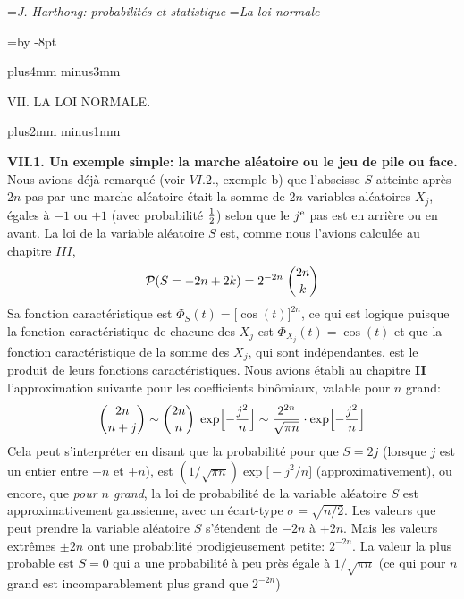 


\auteurcourant={\sl J. Harthong: probabilit\'es et statistique}
\titrecourant={\sl La loi normale}


\def\struta{\vrule depth2pt width0pt}
\def\strutb{\vrule depth4pt width0pt}
\def\strutc{\vrule depth3pt width0pt}
\newdimen\blocksize  \blocksize=\vsize \advance\blocksize by -8pt
\def\ata{\hskip-2.5pt}
\def\aub{\hskip1pt}

\null\vskip10mm plus4mm minus3mm

\centerline{\tit VII.  LA LOI NORMALE.}

\vskip10mm plus2mm minus1mm

{\bf VII.\aub 1. Un exemple simple: la marche al\'eatoire ou le jeu de
pile ou face.}  
\medskip
Nous avions d\'ej\`a remarqu\'e (voir $VI.2.$, exemple b) que l'abscisse 
$S$ atteinte apr\`es $2n$ pas par une marche al\'eatoire \'etait la somme
de $2n$ variables al\'eatoires $X_j$, \'egales \`a $-1$ ou $+1$ (avec
probabilit\'e $1 \over 2$) selon que le $j^{\rm e}$ pas est en arri\`ere ou
en avant. La loi de  la variable al\'eatoire $S$ est, comme nous l'avions
calcul\'ee au chapitre $III$,  
$${\cal P} (S = -2n + 2k) = 2^{-2n}\; {2n \choose k}$$
Sa fonction caract\'eristique est $\Phi_S(t)  = \bigl[\cos (t)\bigr]^{2n}$, 
ce qui est logique puisque la fonction caract\'eristique de chacune des
$X_j$ est $\Phi_{X_j}(t)  = \cos (t)$ et que la fonction caract\'eristique 
de la somme des $X_j$, qui sont ind\'ependantes, est le produit de leurs
fonctions caract\'eristiques. 
\medskip
Nous avions \'etabli au chapitre {\bf II} l'approximation suivante pour les
coefficients bin\^omiaux, valable pour $n$ grand:
$${2n \choose n+j} \sim {2n \choose n} \; \exp \Bigl[ {- {j^2\over
n}}\Bigr] \sim {2^{2n} \over \sqrt{\pi n} } \cdot \exp \Bigl[ {- {j^2\over
n}}\Bigr] $$
Cela peut s'interpr\'eter en disant que la probabilit\'e pour que $S = 2j$
(lorsque $j$ est un entier entre $-n$ et $+n$), est $(1 / \sqrt{\pi n} ) 
\exp \bigl[ -j^2/n\bigr]$ (ap\-pro\-xi\-ma\-ti\-ve\-ment), ou encore, 
que {\it pour $n$ grand}, la loi de probabilit\'e de la variable al\'eatoire
$S$ est ap\-pro\-xi\-ma\-ti\-ve\-ment gaussienne, avec un \'ecart-type 
$\sigma = \sqrt{n/2}$. 
\medskip
Les valeurs que peut prendre la variable al\'eatoire  $S$ s'\'etendent de 
$-2n$ \`a $+2n$. Mais les valeurs extr\^emes $\pm 2n$ ont une
probabilit\'e prodigieusement petite: $2^{-2n}$. La valeur la plus probable
est  $S = 0$ qui a une probabilit\'e \`a peu pr\`es \'egale \`a $1 / \sqrt{\pi
n}$  (ce qui pour $n$ grand est incomparablement plus grand que $2^{-2n}$)
